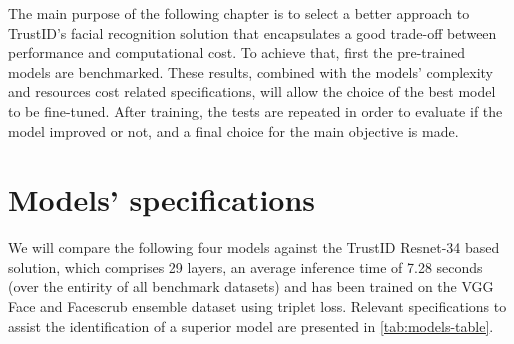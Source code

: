 \documentclass[class=report, crop=false, a4paper, 12pt]{standalone}
\begin{document}
The main purpose of the following chapter is to select a better approach to TrustID's facial recognition solution that encapsulates a good trade-off between performance and computational cost. To achieve that, first the pre-trained models are benchmarked. These results, combined with the models' complexity and resources cost related specifications, will allow the choice of the best model to be fine-tuned. After training, the tests are repeated in order to evaluate if the model improved or not, and a final choice for the main objective is made.

\section{Models' specifications}
\par We will compare the following four models against the TrustID Resnet-34 based solution, which comprises 29 layers, an average inference time of 7.28 seconds (over the entirity of all benchmark datasets) and has been trained on the VGG Face and Facescrub ensemble dataset using triplet loss. Relevant specifications to assist the identification of a superior model are presented in \autoref{tab:models-table}. 
\end{document}
